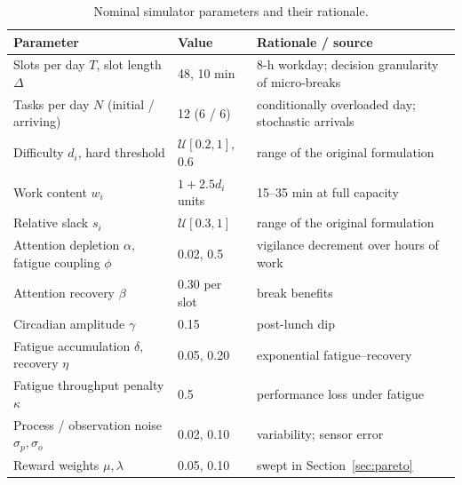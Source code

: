 \begin{table}[!htbp]
\centering
\caption{Nominal simulator parameters and their rationale.}
\label{tab:params}
\small
\begin{tabular}{p{3.9cm}lp{6.1cm}}
\toprule
Parameter & Value & Rationale / source \\
\midrule
Slots per day $T$, slot length $\Delta$ & 48, 10 min & 8-h workday; decision granularity of micro-breaks \cite{albulescu2022} \\
Tasks per day $N$ (initial / arriving) & 12 (6 / 6) & conditionally overloaded day; stochastic arrivals \\
Difficulty $d_i$, hard threshold & $\mathcal U[0.2,1]$, 0.6 & range of the original formulation \\
Work content $w_i$ & $1+2.5d_i$ units & 15--35 min at full capacity \\
Relative slack $s_i$ & $\mathcal U[0.3,1]$ & range of the original formulation \\
Attention depletion $\alpha$, fatigue coupling $\phi$ & 0.02, 0.5 & vigilance decrement over hours of work \cite{warm2008,thomson2015} \\
Attention recovery $\beta$ & 0.30 per slot & break benefits \cite{ariga2011,albulescu2022} \\
Circadian amplitude $\gamma$ & 0.15 & post-lunch dip \cite{monk2005,schmidt2007} \\
Fatigue accumulation $\delta$, recovery $\eta$ & 0.05, 0.20 & exponential fatigue--recovery \cite{jaber2010,jaber2013} \\
Fatigue throughput penalty $\kappa$ & 0.5 & performance loss under fatigue \cite{boksem2008,vandongen2003} \\
Process / observation noise $\sigma_p,\sigma_o$ & 0.02, 0.10 & variability; sensor error \cite{charles2019,hogervorst2014} \\
Reward weights $\mu,\lambda$ & 0.05, 0.10 & swept in Section~\ref{sec:pareto} \\
\bottomrule
\end{tabular}
\end{table}
